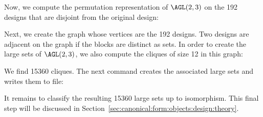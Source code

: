 
Now, we compute the permutation representation of $\AGL(2,3)$ 
on the 192 designs that are disjoint from the original design:


Next, we create the graph whose vertices are the 192 designs. 
Two designs are adjacent on the graph if the blocks are distinct as sets. 
In order to create the large sets of $\AGL(2,3)$, 
we also compute the cliques of size 12 in this graph:



We find 15360 cliques. 
The next command creates the associated large sets and writes them to file:



It remains to classify the resulting 15360 large sets up to isomorphism. 
This final step 
will be discussed in Section~\ref{sec:canonical:form:objects:design:theory}.






